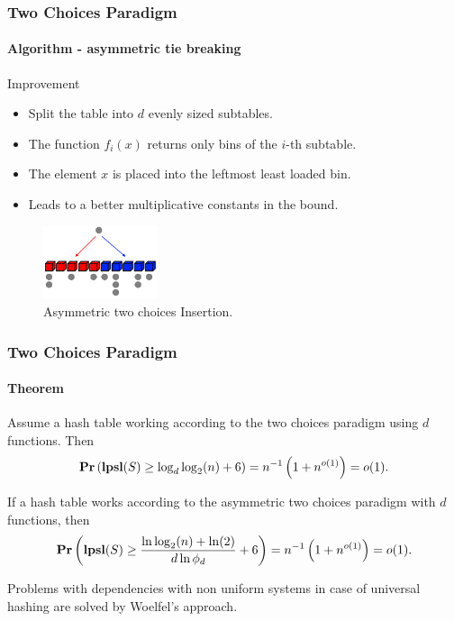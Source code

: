 \begin{frame}
	\frametitle{Two Choices Paradigm}
	\framesubtitle{Algorithm - asymmetric tie breaking}
	
	\begin{block}{Improvement}
		\begin{itemize}
			\item Split the table into $d$ evenly sized subtables.
			\item The function $f_i(x)$ returns only bins of the $i$-th subtable.
			\item The element $x$ is placed into the leftmost least loaded bin.
			\item Leads to a better multiplicative constants in the bound.
		\end{itemize}
	\end{block}
	
	\begin{figure}
		\includegraphics[width=0.3\textwidth]{two-choices-asymmetric.png}
		
		\caption{Asymmetric two choices Insertion.}
	\end{figure}
\end{frame}

\begin{frame}
	\frametitle{Two Choices Paradigm}
	\framesubtitle{Theorem}
	
	\begin{theorem}
		Assume a hash table working according to the two choices paradigm using $d$ functions. Then
		\[
			\mathbf{Pr}\left(\mathbf{lpsl}(S) \geq \log_d \log_2(n) + 6\right) = n^{-1}\left( 1 + n^{o(1)}\right) = o(1).
		\]

		If a hash table works according to the asymmetric two choices paradigm with $d$ functions, then
		\[
			\mathbf{Pr}\left(\mathbf{lpsl}(S) \geq \frac{\ln \log_2(n) + \ln(2)}{d \ln \phi_d} + 6\right) = n^{-1}\left( 1 + n^{o(1)}\right) = o(1).
		\]
	\end{theorem}
	
	Problems with dependencies with non uniform systems in case of universal hashing are solved by Woelfel's approach.
\end{frame}

